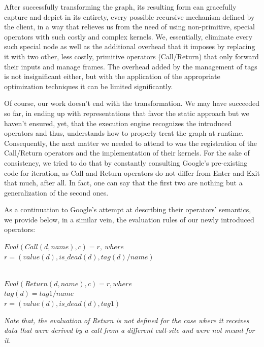 \documentclass[ack,preface]{dithesis}
\begin{document}
After successfully transforming the graph, its resulting form can gracefully capture and depict in its entirety, every possible recursive mechanism defined by the client, in a way that relieves us from the need of using non-primitive, special operators with such costly and complex kernels. We, essentially,  eliminate every such special node as well as the additional overhead that it imposes by replacing it with two other, less costly, primitive operators (Call/Return) that only forward their inputs and manage frames.  The overhead added by the management of tags is not insignificant either, but with the application of the appropriate optimization techniques it can be limited significantly.

Of course, our work doesn't end with the transformation. We may have succeeded so far, in ending up with representations that favor the static approach but we haven't ensured, yet, that the  execution engine recognizes the introduced operators and thus, understands how to properly treat the graph at runtime. Consequently, the next matter we needed to attend to was the registration of the Call/Return operators and the implementation of their kernels.  For the sake of consistency, we tried to do that by constantly consulting Google's pre-existing code for iteration, as Call and Return operators do not differ from Enter and Exit that much, after all. In fact, one can say that the first two are nothing but a generalization of the second ones. 



\begin{flushleft}
\setlength{\parindent}{20ex}As a continuation to Google's attempt at describing their operators' semantics, we provide below, in a similar vein, 
the evaluation rules of our newly introduced operators:

 $Eval(Call(d, name), c) = r,\  where$ \\
\setlength{\parindent}{25ex} $r = (value(d), is\_dead(d), tag(d)/name)$ 


\setlength{\parindent}{20ex} \ \\
$Eval(Return(d, name), c) = r, where \ $ \\
\setlength{\parindent}{25ex} $tag(d) = tag1/name$\\
$ r = (value(d), is\_dead(d), tag1)$
\end{flushleft}

\textit{Note that, the evaluation of Return is not defined for the case where it receives data that were derived by a call from a different call-site and were not meant for it.}\\
\end{document}
